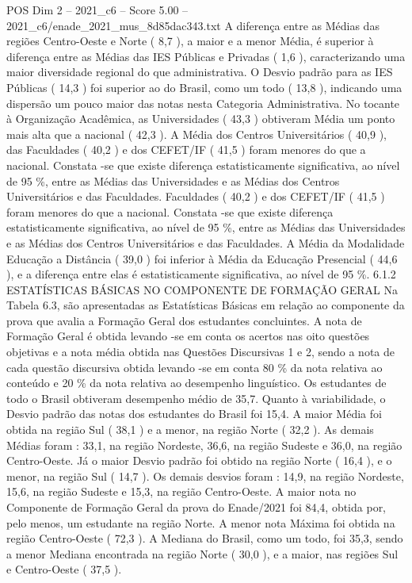 \begin{textsample}{POS Dim 2 – 2021\_c6 – Score 5.00 – 2021\_c6/enade\_2021\_mus\_8d85dac343.txt}
A diferença entre as Médias das regiões Centro-Oeste e Norte ( 8,7 ), a maior e a menor Média, é superior à diferença entre as Médias das IES Públicas e Privadas ( 1,6 ), caracterizando uma maior diversidade regional do que administrativa.
O Desvio padrão para as IES Públicas ( 14,3 ) foi superior ao do Brasil, como um todo ( 13,8 ), indicando uma dispersão um pouco maior das notas nesta Categoria Administrativa.
No tocante à Organização Acadêmica, as Universidades ( 43,3 ) obtiveram Média um ponto mais alta que a nacional ( 42,3 ).
A Média dos Centros Universitários ( 40,9 ), das Faculdades ( 40,2 ) e dos CEFET/IF ( 41,5 ) foram menores do que a nacional.
Constata -se que existe diferença estatisticamente significativa, ao nível de 95 \%, entre as Médias das Universidades e as Médias dos Centros Universitários e das Faculdades.
Faculdades ( 40,2 ) e dos CEFET/IF ( 41,5 ) foram menores do que a nacional.
Constata -se que existe diferença estatisticamente significativa, ao nível de 95 \%, entre as Médias das Universidades e as Médias dos Centros Universitários e das Faculdades.
A Média da Modalidade Educação a Distância ( 39,0 ) foi inferior à Média da Educação Presencial ( 44,6 ), e a diferença entre elas é estatisticamente significativa, ao nível de 95 \%. 6.1.2 ESTATÍSTICAS BÁSICAS NO COMPONENTE DE FORMAÇÃO GERAL Na Tabela 6.3, são apresentadas as Estatísticas Básicas em relação ao componente da prova que avalia a Formação Geral dos estudantes concluintes.
A nota de Formação Geral é obtida levando -se em conta os acertos nas oito questões objetivas e a nota média obtida nas Questões Discursivas 1 e 2, sendo a nota de cada questão discursiva obtida levando -se em conta 80 \% da nota relativa ao conteúdo e 20 \% da nota relativa ao desempenho linguístico.
Os estudantes de todo o Brasil obtiveram desempenho médio de 35,7.
Quanto à variabilidade, o Desvio padrão das notas dos estudantes do Brasil foi 15,4.
A maior Média foi obtida na região Sul ( 38,1 ) e a menor, na região Norte ( 32,2 ).
As demais Médias foram : 33,1, na região Nordeste, 36,6, na região Sudeste e 36,0, na região Centro-Oeste.
Já o maior Desvio padrão foi obtido na região Norte ( 16,4 ), e o menor, na região Sul ( 14,7 ).
Os demais desvios foram : 14,9, na região Nordeste, 15,6, na região Sudeste e 15,3, na região Centro-Oeste.
A maior nota no Componente de Formação Geral da prova do Enade/2021 foi 84,4, obtida por, pelo menos, um estudante na região Norte.
A menor nota Máxima foi obtida na região Centro-Oeste ( 72,3 ).
A Mediana do Brasil, como um todo, foi 35,3, sendo a menor Mediana encontrada na região Norte ( 30,0 ), e a maior, nas regiões Sul e Centro-Oeste ( 37,5 ).

\end{textsample}
